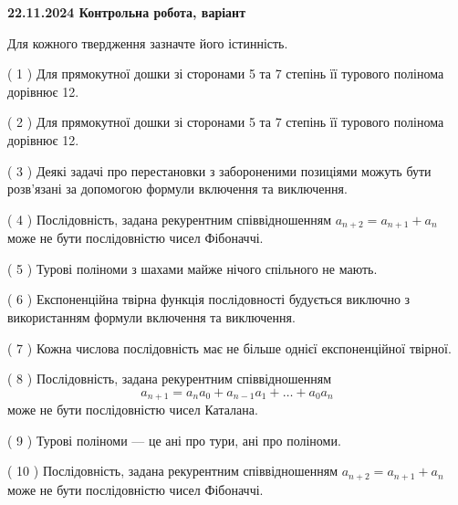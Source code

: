 \documentclass[12pt, ukrainian]{article}
\begin{document}
\vspace{4mm}
\newpage
\begin {large}

\textbf{22.11.2024 Контрольна робота, варіант  }\par


{
Для кожного твердження зазначте його істинність.\par
\vspace{2mm}
( 1 ) Для прямокутної дошки зі сторонами 5 та 7 степінь її турового полінома дорівнює 12.%

( 2 ) Для прямокутної дошки зі сторонами 5 та 7 степінь її турового полінома дорівнює 12.%

( 3 ) Деякі задачі про перестановки з забороненими позиціями можуть бути розв’я\-за\-ні за допомогою формули включення та виключення.%

( 4 ) Послідовність, задана рекурентним співвідношенням $a_{n+2}=a_{n+1}+a_{n}$ може не бути послідовністю чисел Фібоначчі.%

( 5 ) Турові поліноми з шахами майже нічого спільного не мають.%

( 6 ) Експоненційна твірна функція послідовності будується виключно з використанням формули включення та виключення.%

( 7 ) Кожна числова послідовність має не більше однієї  експоненційної твірної.%

( 8 ) Послідовність, задана рекурентним співвідношенням $$a_{n+1}=a_{n}a_{0}+a_{n-1}a_{1}+\ldots+a_0a_{n}$$ може не бути послідовністю чисел Каталана.%

( 9 ) Турові поліноми --- це ані про тури, ані про поліноми.%

( 10 ) Послідовність, задана рекурентним співвідношенням $a_{n+2}=a_{n+1}+a_{n}$ може не бути послідовністю чисел Фібоначчі.%


\vspace{5mm}
}
\end {large}
\end{document}
